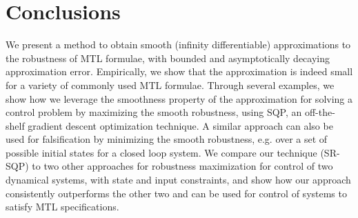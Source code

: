 \section{Conclusions}
We present a method to obtain smooth (infinity differentiable) approximations to the robustness of MTL formulae, with bounded and asymptotically decaying approximation error. 
Empirically, we show that the approximation is indeed small for a variety of commonly used MTL formulae. 
Through several examples, we show how we leverage the smoothness property of the approximation for solving a control problem by maximizing the smooth robustness, using SQP, an off-the-shelf gradient descent optimization technique. A similar approach can also be used for falsification by minimizing the smooth robustness, e.g. over a set of possible initial states for a closed loop system. We compare our technique (SR-SQP) to two other approaches for robustness maximization for control of two dynamical systems, with state and input constraints, and show how our approach consistently outperforms the other two and can be used for control of systems to satisfy MTL specifications.

